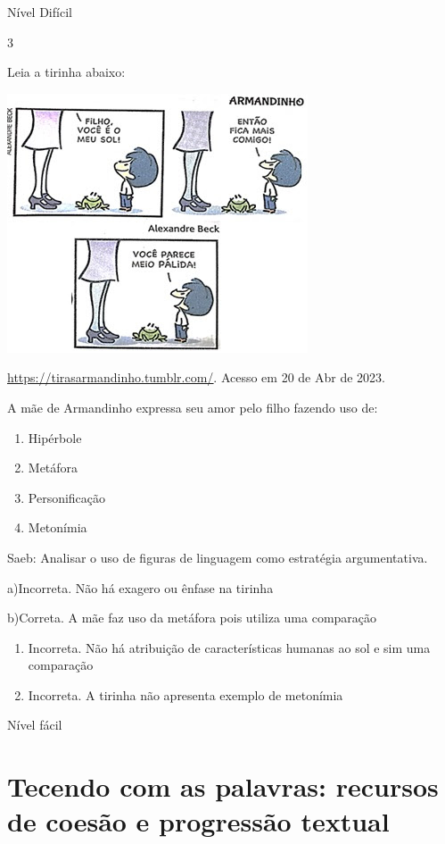 {{\begin{escolha}
{Nível Difícil

\num{3}

Leia a tirinha abaixo:

\includegraphics[width=3.51042in,height=3.02083in]{./imgSAEB_7_POR/media/image14.png}

\href{https://tirasarmandinho.tumblr.com/}{\uline{https://tirasarmandinho.tumblr.com/}}.
Acesso em 20 de Abr de 2023.

A mãe de Armandinho expressa seu amor pelo filho fazendo uso de:

\begin{enumerate}
\def\labelenumi{\alph{enumi})}
\item
  Hipérbole
\item
  Metáfora
\item
  Personificação
\item
  Metonímia
\end{enumerate}

Saeb: Analisar o uso de figuras de linguagem como estratégia
argumentativa.

a)Incorreta. Não há exagero ou ênfase na tirinha

b)Correta. A mãe faz uso da metáfora pois utiliza uma comparação

\begin{enumerate}
\def\labelenumi{\arabic{enumi}.}
\item
  Incorreta. Não há atribuição de características humanas ao sol e sim
  uma comparação
\item
  Incorreta. A tirinha não apresenta exemplo de metonímia
\end{enumerate}

Nível fácil


\chapter{Tecendo com as palavras: recursos de coesão e progressão textual}

}
\end{escolha}}}
